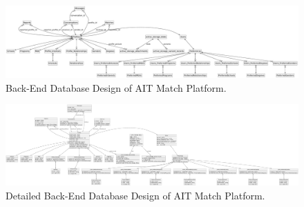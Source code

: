         \begin{figure}[h]
            \centering
            \captionsetup{justification=centering, singlelinecheck=false, labelsep=space}
            \includegraphics[width=5in]{figures/er-diagram/er-diagram.pdf} %
            \caption{Back-End Database Design of AIT Match Platform.}
            \label{fig:er-diagram}
        \end{figure}
        
        \begin{figure}[h]
            \centering
            \captionsetup{justification=centering, singlelinecheck=false, labelsep=space}
            \includegraphics[width=5in]{figures/er-diagram/detailed-er-diagram.pdf} %
            \caption{Detailed Back-End Database Design of AIT Match Platform.}
            \label{fig:detailed-er-diagram}
        \end{figure}  

    \newpage
